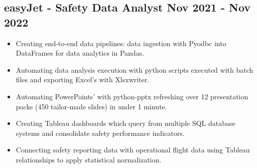 \documentclass[a4paper,9pt]{article}
\begin{document}
\subsection*{\textbf{easyJet - Safety Data Analyst} \hfill  Nov 2021 - Nov 2022}
\begin{itemize}[noitemsep]
	\item Creating end-to-end data pipelines: data ingestion with Pyodbc into DataFrames for data analytics in Pandas.
	\item Automating data analysis execution with python scripts executed with batch files and exporting Excel's with Xlsxwriter.
	\item Automating PowerPoints' with python-pptx refreshing over 12 presentation packs (450 tailor-made slides) in under 1 minute.
	\item Creating Tableau dashboards which query from multiple SQL database systems and consolidate safety performance indicators.
    \item Connecting safety reporting data with operational flight data using Tableau relationships to apply statistical normalization.


%


\end{itemize}
\end{document}
